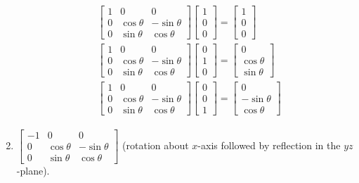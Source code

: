 \documentclass[twoside]{amsart}
\theoremstyle{plain}
\theoremstyle{definition}
\begin{document}
\begin{enumerate}
\[\begin{gathered}
  \begin{aligned}
    & \left[ \begin{matrix} 1 & 0 & 0 \\ 0 & \cos{\theta} & - \sin{\theta} \\ 0 & \sin{\theta} & \cos{\theta} \end{matrix} \right] \left[ \begin{matrix} 1 \\ 0 \\ 0 \end{matrix} \right] = \left[ \begin{matrix} 1 \\ 0 \\ 0 \end{matrix} \right] \\
    & \left[ \begin{matrix} 1 & 0 & 0 \\ 0 & \cos{\theta} & - \sin{\theta} \\ 0 & \sin{\theta} & \cos{\theta} \end{matrix} \right] \left[ \begin{matrix} 0 \\ 1 \\ 0 \end{matrix} \right] = \left[ \begin{matrix} 0 \\ \cos{\theta} \\ \sin{\theta} \end{matrix} \right] \\ 
    & \left[ \begin{matrix} 1 & 0 & 0 \\ 0 & \cos{\theta} & - \sin{\theta} \\ 0 & \sin{\theta} & \cos{\theta} \end{matrix} \right] \left[ \begin{matrix} 0 \\ 0 \\ 1 \end{matrix} \right] = \left[ \begin{matrix} 0 \\ -\sin{\theta} \\ \cos{\theta} \end{matrix} \right]
  \end{aligned}
\end{gathered}
\]
\item $\left[ \begin{matrix} -1 & 0 & 0 \\ 0 & \cos{\theta} & - \sin{\theta} \\ 0 & \sin{\theta} & \cos{\theta} \end{matrix} \right]$ (rotation about $x$-axis followed by reflection in the $yz$-plane).  

\end{enumerate}
\end{document}

